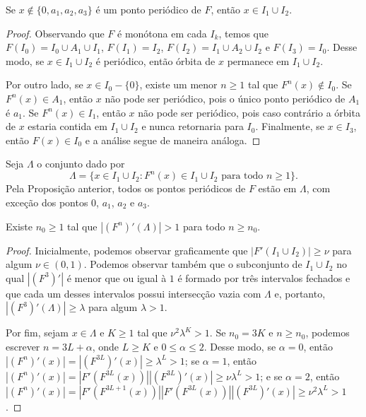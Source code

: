 \begin{proposition}
Se $x \notin \lbrace 0, a_1, a_2, a_3 \rbrace$ é um ponto periódico de $F$, então $x \in I_1 \cup I_2$.
\end{proposition}

\begin{proof}
Observando que $F$ é monótona em cada $I_k$, temos que $F(I_0) = I_0 \cup A_1 \cup I_1$, $F(I_1) = I_2$, $F(I_2) = I_1 \cup A_2 \cup I_2$ e $F(I_3) = I_0$. Desse modo, se $x \in I_1 \cup I_2$ é periódico, então órbita de $x$ permanece em $I_1 \cup I_2$.

Por outro lado, se $x \in I_0 - \lbrace 0 \rbrace$, existe um menor $n \geq 1$ tal que $F^n(x) \notin I_0$. Se $F^n(x) \in A_1$, então $x$ não pode ser periódico, pois o único ponto periódico de $A_1$ é $a_1$.
Se $F^n(x) \in I_1$, então $x$ não pode ser periódico, pois caso contrário a órbita de $x$ estaria contida em $I_1 \cup I_2$ e nunca retornaria para $I_0$.
Finalmente, se $x \in I_3$, então $F(x) \in I_0$ e a análise segue de maneira análoga.
\end{proof}

Seja $\Lambda$ o conjunto dado por
$$\Lambda = \lbrace x \in I_1 \cup I_2 : F^n(x) \in I_1 \cup I_2 \text{ para todo } n \geq 1 \rbrace.$$
Pela Proposição anterior, todos os pontos periódicos de $F$ estão em $\Lambda$, com exceção dos pontos $0$, $a_1$, $a_2$ e $a_3$.

\begin{lemma}
Existe $n_0 \geq 1$ tal que $|(F^n)'(\Lambda)| > 1$ para todo $n \geq n_0$.
\end{lemma}

\begin{proof}
Inicialmente, podemos observar graficamente que $|F'(I_1 \cup I_2)| \geq \nu$ para algum $\nu \in (0, 1)$.
Podemos observar também que o subconjunto de $I_1 \cup I_2$ no qual $|(F^3)'|$ é menor que ou igual à $1$ é formado por três intervalos fechados e que cada um desses intervalos possui intersecção vazia com $\Lambda$ e, portanto, $|(F^3)'(\Lambda)| \geq \lambda$ para algum $\lambda > 1$.

Por fim, sejam $x \in \Lambda$ e $K \geq 1$ tal que $\nu^2 \lambda^K > 1$. Se $n_0 = 3K$ e $n \geq n_0$, podemos escrever $n = 3L + \alpha$, onde $L \geq K$ e $0 \leq \alpha \leq 2$. Desse modo, se $\alpha = 0$, então $ \left| (F^n)'(x) \right|
= \left| (F^{3L})'(x) \right|
\geq \lambda^L > 1$; se $\alpha = 1$, então $ \left| (F^n)'(x) \right| = \left| F'(F^{3L}(x)) \right| \left| (F^{3L})'(x)\right|
\geq \nu \lambda^L > 1$; e se $\alpha = 2$, então $ \left| (F^n)'(x) \right| = \left| F' (F^{3L+1}(x)) \right| \left| F' (F^{3L}(x)) \right| \left| (F^{3L})'(x) \right|
\geq \nu^2 \lambda^L > 1$.
\end{proof}

